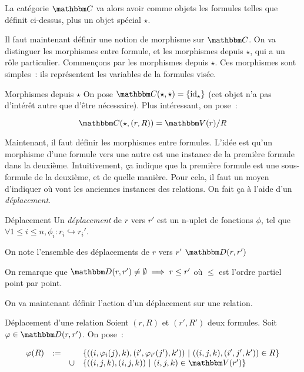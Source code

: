 La catégorie $\C$ va alors avoir comme objets les formules telles que définit ci-dessus,
plus un objet spécial $\star$.

Il faut maintenant définir une notion de morphisme sur $\C$. On va distinguer les
morphismes entre formule, et les morphismes depuis $\star$, qui a un rôle particulier.
Commençons par les morphismes depuis $\star$. Ces morphismes sont simples~: ils 
représentent les variables de la formules visée.

\begin{defi}{Morphismes depuis $\star$}
    On pose $\C(\star,\star) = \{\text{id}_\star\}$ (cet objet n'a pas d'intérêt autre
    que d'être nécessaire). Plus intéressant, on pose~:

    \[\C(\star, (r,R)) = \V(r)/R \]
\end{defi}

Maintenant, il faut définir les morphismes entre formules. L'idée est qu'un morphisme
d'une formule vers une autre est une instance de la première formule dans la deuxième.
Intuitivement, ça indique que la première formule est une sous-formule de la deuxième,
et de quelle manière. Pour cela, il faut un moyen d'indiquer où vont les anciennes
instances des relations. On fait ça à l'aide d'un \emph{déplacement}.

\begin{defi}{Déplacement}
    Un \emph{déplacement} de $r$ vers $r'$ est un n-uplet de fonctions $\phi$, tel que
    $\forall 1\leq i\leq n, \phi_i : r_i\hookrightarrow r_i'$.

    On note l'ensemble des déplacements de $r$ vers $r'$ $\D(r,r')$
\end{defi}

\begin{rem}
    On remarque que $\D(r,r')\neq\emptyset\implies r\leq r'$ où $\leq$ est l'ordre
    partiel point par point.
\end{rem}

On va maintenant définir l'action d'un déplacement sur une relation.

\begin{defi}{Déplacement d'une relation}
    Soient $(r,R)$ et $(r',R')$ deux formules. Soit $\phi\in\D(r,r')$. On pose~:

    \[ \begin{array}{rccl}
          \phi(R) &:= & & \{ ((i,\phi_i(j), k), (i', \phi_{i'}(j'), k'))
                           ~|~ ((i,j,k), (i',j',k'))\in R \} \\
                  &   & \cup &\{ ((i,j,k), (i,j,k)) ~|~ (i,j,k)\in\V(r') \} \\
    \end{array} \]
\end{defi}

